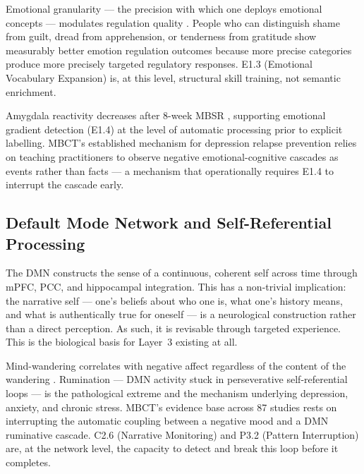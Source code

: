\documentclass[12pt, a4paper]{article}
\begin{document}
Emotional granularity --- the precision with which one deploys emotional concepts ---
modulates regulation quality \citep{barrett2017}. People who can distinguish shame
from guilt, dread from apprehension, or tenderness from gratitude show measurably
better emotion regulation outcomes because more precise categories produce more
precisely targeted regulatory responses. E1.3 (Emotional Vocabulary Expansion) is,
at this level, structural skill training, not semantic enrichment.

Amygdala reactivity decreases after 8-week MBSR \citep{gkintoni2025}, supporting
emotional gradient detection (E1.4) at the level of automatic processing prior to
explicit labelling. MBCT's established mechanism for depression relapse prevention
relies on teaching practitioners to observe negative emotional-cognitive cascades as
events rather than facts --- a mechanism that operationally requires E1.4 to
interrupt the cascade early.

\subsection{Default Mode Network and Self-Referential Processing}

The DMN constructs the sense of a continuous, coherent self across time through
mPFC, PCC, and hippocampal integration. This has a non-trivial implication: the
narrative self --- one's beliefs about who one is, what one's history means, and
what is authentically true for oneself --- is a neurological construction rather
than a direct perception. As such, it is revisable through targeted experience.
This is the biological basis for Layer~3 existing at all.

Mind-wandering correlates with negative affect regardless of the content of the
wandering \citep{killingsworth2010}. Rumination --- DMN activity stuck in perseverative
self-referential loops --- is the pathological extreme and the mechanism underlying
depression, anxiety, and chronic stress. MBCT's evidence base across 87 studies
\citep{gkintoni2025} rests on interrupting the automatic coupling between a negative
mood and a DMN ruminative cascade. C2.6 (Narrative Monitoring) and P3.2 (Pattern
Interruption) are, at the network level, the capacity to detect and break this loop
before it completes.
\end{document}
